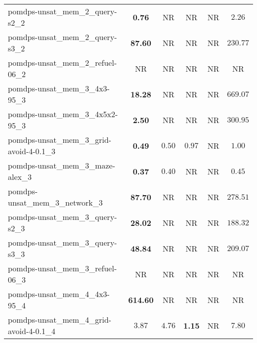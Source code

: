 \begin{tabular}{lccccc}
pomdps-unsat\_mem\_2\_query-s2\_2 & \textbf{0.76} & NR & NR & NR & $2.26$ \\
pomdps-unsat\_mem\_2\_query-s3\_2 & \textbf{87.60} & NR & NR & NR & $230.77$ \\
pomdps-unsat\_mem\_2\_refuel-06\_2 & NR & NR & NR & NR & NR \\
pomdps-unsat\_mem\_3\_4x3-95\_3 & \textbf{18.28} & NR & NR & NR & $669.07$ \\
pomdps-unsat\_mem\_3\_4x5x2-95\_3 & \textbf{2.50} & NR & NR & NR & $300.95$ \\
pomdps-unsat\_mem\_3\_grid-avoid-4-0.1\_3 & \textbf{0.49} & $0.50$ & $0.97$ & NR & $1.00$ \\
pomdps-unsat\_mem\_3\_maze-alex\_3 & \textbf{0.37} & $0.40$ & NR & NR & $0.45$ \\
pomdps-unsat\_mem\_3\_network\_3 & \textbf{87.70} & NR & NR & NR & $278.51$ \\
pomdps-unsat\_mem\_3\_query-s2\_3 & \textbf{28.02} & NR & NR & NR & $188.32$ \\
pomdps-unsat\_mem\_3\_query-s3\_3 & \textbf{48.84} & NR & NR & NR & $209.07$ \\
pomdps-unsat\_mem\_3\_refuel-06\_3 & NR & NR & NR & NR & NR \\
pomdps-unsat\_mem\_4\_4x3-95\_4 & \textbf{614.60} & NR & NR & NR & NR \\
pomdps-unsat\_mem\_4\_grid-avoid-4-0.1\_4 & $3.87$ & $4.76$ & \textbf{1.15} & NR & $7.80$ \\
\bottomrule
\end{tabular}
